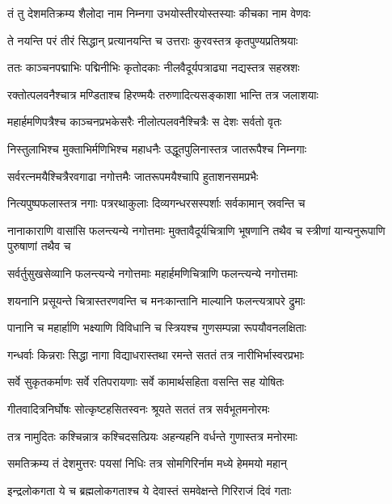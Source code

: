 \twolineshloka
{तं तु देशमतिक्रम्य शैलोदा नाम निम्नगा}
{उभयोस्तीरयोस्तस्याः कीचका नाम वेणवः} %

\twolineshloka
{ते नयन्ति परं तीरं सिद्धान् प्रत्यानयन्ति च}
{उत्तराः कुरवस्तत्र कृतपुण्यप्रतिश्रयाः} %

\twolineshloka
{ततः काञ्चनपद्माभिः पद्मिनीभिः कृतोदकाः}
{नीलवैदूर्यपत्राढ्या नद्यस्तत्र सहस्रशः} %

\twolineshloka
{रक्तोत्पलवनैश्चात्र मण्डिताश्च हिरण्मयैः}
{तरुणादित्यसङ्काशा भान्ति तत्र जलाशयाः} %

\twolineshloka
{महार्हमणिपत्रैश्च काञ्चनप्रभकेसरैः}
{नीलोत्पलवनैश्चित्रैः स देशः सर्वतो वृतः} %

\twolineshloka
{निस्तुलाभिश्च मुक्ताभिर्मणिभिश्च महाधनैः}
{उद्धूतपुलिनास्तत्र जातरूपैश्च निम्नगाः} %

\twolineshloka
{सर्वरत्नमयैश्चित्रैरवगाढा नगोत्तमैः}
{जातरूपमयैश्चापि हुताशनसमप्रभैः} %

\twolineshloka
{नित्यपुष्पफलास्तत्र नगाः पत्ररथाकुलाः}
{दिव्यगन्धरसस्पर्शाः सर्वकामान् स्रवन्ति च} %

\threelineshloka
{नानाकाराणि वासांसि फलन्त्यन्ये नगोत्तमाः}
{मुक्तावैदूर्यचित्राणि भूषणानि तथैव च}
{स्त्रीणां यान्यनुरूपाणि पुरुषाणां तथैव च} %

\twolineshloka
{सर्वर्तुसुखसेव्यानि फलन्त्यन्ये नगोत्तमाः}
{महार्हमणिचित्राणि फलन्त्यन्ये नगोत्तमाः} %

\twolineshloka
{शयनानि प्रसूयन्ते चित्रास्तरणवन्ति च}
{मनःकान्तानि माल्यानि फलन्त्यत्रापरे द्रुमाः} %

\twolineshloka
{पानानि च महार्हाणि भक्ष्याणि विविधानि च}
{स्त्रियश्च गुणसम्पन्ना रूपयौवनलक्षिताः} %

\twolineshloka
{गन्धर्वाः किन्नराः सिद्धा नागा विद्याधरास्तथा}
{रमन्ते सततं तत्र नारीभिर्भास्वरप्रभाः} %

\twolineshloka
{सर्वे सुकृतकर्माणः सर्वे रतिपरायणाः}
{सर्वे कामार्थसहिता वसन्ति सह योषितः} %

\twolineshloka
{गीतवादित्रनिर्घोषः सोत्कृष्टहसितस्वनः}
{श्रूयते सततं तत्र सर्वभूतमनोरमः} %

\twolineshloka
{तत्र नामुदितः कश्चिन्नात्र कश्चिदसत्प्रियः}
{अहन्यहनि वर्धन्ते गुणास्तत्र मनोरमाः} %

\twolineshloka
{समतिक्रम्य तं देशमुत्तरः पयसां निधिः}
{तत्र सोमगिरिर्नाम मध्ये हेममयो महान्} %

\twolineshloka
{इन्द्रलोकगता ये च ब्रह्मलोकगताश्च ये}
{देवास्तं समवेक्षन्ते गिरिराजं दिवं गताः} %

